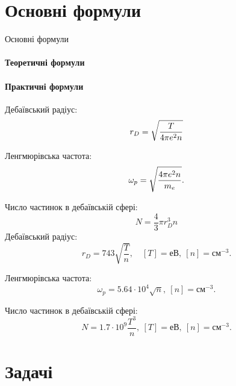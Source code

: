 \documentclass[]{beamer}
\begin{document}
\section{Основні формули}

\begin{frame}{Основні формули}
	\framesubtitle<1>{Теоретичні формули}
	\framesubtitle<2>{Практичні формули}
	\begin{overprint}
		Дебаївський радіус:
		\begin{equation*}
			r_D = \sqrt{\frac{T}{4\pi e^2n}}
		\end{equation*}

		Ленгмюрівська частота:
		\begin{equation*}
			\omega_p = \sqrt{\frac{4\pi e^2n}{m_e}} .
		\end{equation*}

        Число частинок в дебаївській сфері:
        \begin{equation*}
            N = \frac43\pi r_D^3 n
        \end{equation*}
		\onslide<2>
		Дебаївський радіус:
		\begin{equation*}
			r_D = 743\sqrt{\frac{T}{n}}, \quad [T] = \text{еВ},\ [n] = \text{см}^{-3}.
		\end{equation*}

		Ленгмюрівська частота:
		\begin{equation*}
			\omega_p = 5.64\cdot10^4\sqrt{n},\ [n] = \text{см}^{-3}.
		\end{equation*}

          Число частинок в дебаївській сфері:
          \begin{equation*}
              N = 1.7\cdot 10^{9}\frac{T^3}{n},\ [T] = \text{еВ},\ [n] = \text{см}^{-3}.
          \end{equation*}
	\end{overprint}
\end{frame}


\section{Задачі}


\end{document}
